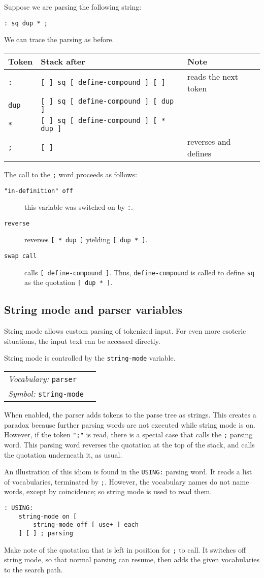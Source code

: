\documentclass{book}
\newcommand{\vocabulary}[1]{\emph{Vocabulary:} \texttt{#1}&\\}
\newcommand{\symbolword}[1]{\index{\texttt{#1}}\emph{Symbol:} \texttt{#1}&\\}
\newcommand{\wordtable}[1]{


\begin{tabularx}{12cm}{lX}
\hline
#1
\hline
\end{tabularx}

}
\begin{document}
Suppose we are parsing the following string:
\begin{verbatim}
: sq dup * ;
\end{verbatim}

We can trace the parsing as before.

\begin{tabular}{l|l|l}
\hline
Token&Stack after&Note\\
\hline
\verb|:|&\verb|[ ] sq [ define-compound ] [ ]|&reads the next token\\
\verb|dup|&\verb|[ ] sq [ define-compound ] [ dup ]|\\
\verb|*|&\verb|[ ] sq [ define-compound ] [ * dup ]|&\\
\verb|;|&\verb|[ ]|&reverses and defines
\end{tabular}

The call to the \verb|;| word proceeds as follows:
\begin{description}
\item[\texttt{"in-definition" off}] this variable was switched on by \verb|:|.
\item[\texttt{reverse}] reverses \verb|[ * dup ]| yielding \verb|[ dup * ]|.
\item[\texttt{swap call}] calls \texttt{[ define-compound ]}. Thus, \verb|define-compound| is called to define \verb|sq| as the quotation \verb|[ dup * ]|.
\end{description}

\subsection{String mode and parser variables}\label{string-mode}
\stringmodeglos
String mode allows custom parsing of tokenized input. For even more esoteric situations, the input text can be accessed directly.

String mode is controlled by the \verb|string-mode| variable.

\wordtable{
\vocabulary{parser}
\symbolword{string-mode}
}
When enabled, the parser adds tokens to the parse tree as strings. This creates a paradox because further parsing words are not executed while string mode is on. However, if the token \verb|";"| is read, there is a special case that calls the \verb|;| parsing word. This parsing word reverses the quotation at the top of the stack, and calls the quotation underneath it, as usual.

An illustration of this idiom is found in the \verb|USING:| parsing word. It reads a list of vocabularies, terminated by \verb|;|. However, the vocabulary names do not name words, except by coincidence; so string mode is used to read them.
\begin{verbatim}
: USING: 
    string-mode on [
        string-mode off [ use+ ] each
    ] [ ] ; parsing
\end{verbatim}
Make note of the quotation that is left in position for \verb|;| to call. It switches off string mode, so that normal parsing can resume, then adds the given vocabularies to the search path.
\end{document}
